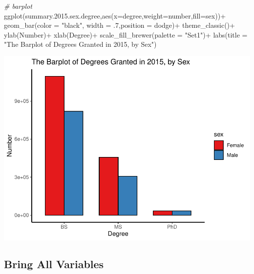 \documentclass[
  12pt,
]{article}
\newenvironment{Shaded}{\begin{snugshade}}{\end{snugshade}}
\newcommand{\AttributeTok}[1]{\textcolor[rgb]{0.77,0.63,0.00}{#1}}
\newcommand{\CommentTok}[1]{\textcolor[rgb]{0.56,0.35,0.01}{\textit{#1}}}
\newcommand{\DecValTok}[1]{\textcolor[rgb]{0.00,0.00,0.81}{#1}}
\newcommand{\FloatTok}[1]{\textcolor[rgb]{0.00,0.00,0.81}{#1}}
\newcommand{\FunctionTok}[1]{\textcolor[rgb]{0.00,0.00,0.00}{#1}}
\newcommand{\NormalTok}[1]{#1}
\newcommand{\SpecialCharTok}[1]{\textcolor[rgb]{0.00,0.00,0.00}{#1}}
\newcommand{\StringTok}[1]{\textcolor[rgb]{0.31,0.60,0.02}{#1}}
\begin{document}
\begin{Shaded}
\begin{Highlighting}[]
\CommentTok{\# barplot}
\FunctionTok{ggplot}\NormalTok{(summary.}\FloatTok{2015.}\NormalTok{sex.degree,}\FunctionTok{aes}\NormalTok{(}\AttributeTok{x=}\NormalTok{degree,}\AttributeTok{weight=}\NormalTok{number,}\AttributeTok{fill=}\NormalTok{sex))}\SpecialCharTok{+}
  \FunctionTok{geom\_bar}\NormalTok{(}\AttributeTok{color =} \StringTok{"black"}\NormalTok{, }\AttributeTok{width =}\NormalTok{ .}\DecValTok{7}\NormalTok{,}\AttributeTok{position =} \StringTok{\textquotesingle{}dodge\textquotesingle{}}\NormalTok{)}\SpecialCharTok{+}
  \FunctionTok{theme\_classic}\NormalTok{()}\SpecialCharTok{+}
  \FunctionTok{ylab}\NormalTok{(}\StringTok{\textquotesingle{}Number\textquotesingle{}}\NormalTok{)}\SpecialCharTok{+}
  \FunctionTok{xlab}\NormalTok{(}\StringTok{\textquotesingle{}Degree\textquotesingle{}}\NormalTok{)}\SpecialCharTok{+}
  \FunctionTok{scale\_fill\_brewer}\NormalTok{(}\AttributeTok{palette =} \StringTok{"Set1"}\NormalTok{)}\SpecialCharTok{+}
  \FunctionTok{labs}\NormalTok{(}\AttributeTok{title =} \StringTok{"The Barplot of Degrees Granted in 2015, by Sex"}\NormalTok{)}
\end{Highlighting}
\end{Shaded}

\includegraphics{hw1_sol_files/figure-latex/unnamed-chunk-9-1.pdf}

\hypertarget{bring-all-variables}{%
\subsection{Bring All Variables}\label{bring-all-variables}}
\end{document}
